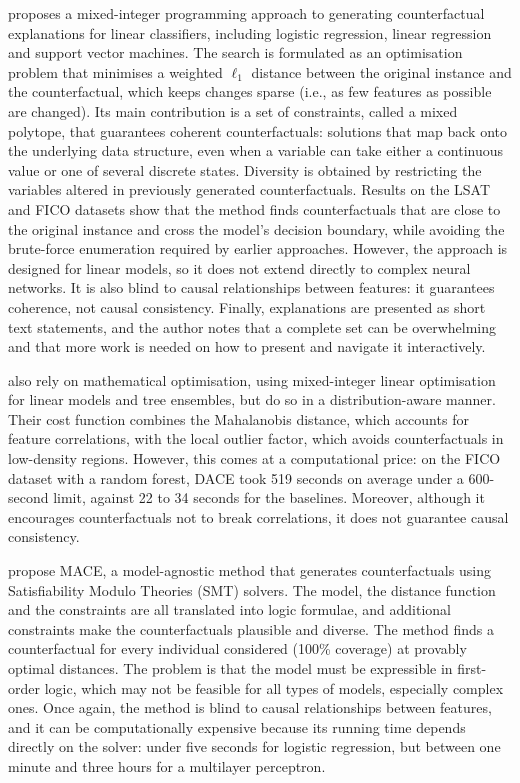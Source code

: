 \citet{russell2019efficient} proposes a mixed-integer programming approach to generating
counterfactual explanations for linear classifiers, including logistic regression, linear regression
and support vector machines. The search is formulated as an optimisation problem that minimises a
weighted $\ell_1$ distance between the original instance and the counterfactual, which keeps changes
sparse (i.e., as few features as possible are changed). Its main contribution is a set of constraints,
called a mixed polytope, that guarantees coherent counterfactuals: solutions that map back onto the
underlying data structure, even when a variable can take either a continuous value or one of several
discrete states. Diversity is obtained by restricting the variables altered in previously generated
counterfactuals. Results on the LSAT and FICO datasets show that the method finds counterfactuals that
are close to the original instance and cross the model's decision boundary, while avoiding the
brute-force enumeration required by earlier approaches. However, the approach is designed for linear
models, so it does not extend directly to complex neural networks. It is also blind to causal
relationships between features: it guarantees coherence, not causal consistency. Finally, explanations
are presented as short text statements, and the author notes that a complete set can be overwhelming
and that more work is needed on how to present and navigate it interactively.

\citet{kanamori2020dace} also rely on mathematical optimisation, using mixed-integer linear optimisation
for linear models and tree ensembles, but do so in a distribution-aware manner. Their cost function
combines the Mahalanobis distance, which accounts for feature correlations, with the local outlier
factor, which avoids counterfactuals in low-density regions. However, this comes at a computational
price: on the FICO dataset with a random forest, DACE took 519 seconds on average under a 600-second
limit, against 22 to 34 seconds for the baselines. Moreover, although it encourages counterfactuals not
to break correlations, it does not guarantee causal consistency.

\citet{karimi2020model} propose MACE, a model-agnostic method that generates counterfactuals using
Satisfiability Modulo Theories (SMT) solvers. The model, the distance function and the constraints are
all translated into logic formulae, and additional constraints make the counterfactuals plausible and
diverse. The method finds a counterfactual for every individual considered (100\% coverage) at provably
optimal distances. The problem is that the model must be expressible in first-order logic, which may
not be feasible for all types of models, especially complex ones. Once again, the method is blind to
causal relationships between features, and it can be computationally expensive because its running
time depends directly on the solver: under five seconds for logistic regression, but between one
minute and three hours for a multilayer perceptron.

